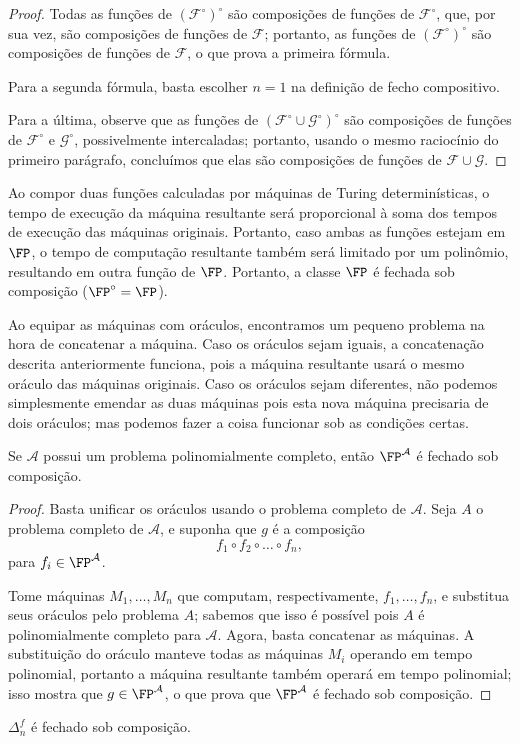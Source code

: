\begin{proof}
    Todas as funções de $(\mathcal F^\circ)^\circ$
    são composições de funções de $\mathcal F^\circ$,
    que, por sua vez,
    são composições de funções de $\mathcal F$;
    portanto, as funções de $(\mathcal F^\circ)^\circ$
    são composições de funções de $\mathcal F$,
    o que prova a primeira fórmula.

    Para a segunda fórmula,
    basta escolher $n = 1$ na definição de fecho compositivo.

    Para a última,
    observe que as funções de $(\mathcal F^\circ \cup \mathcal G^\circ)^\circ$
    são composições de funções de $\mathcal F^\circ$ e $\mathcal G^\circ$,
    possivelmente intercaladas;
    portanto, usando o mesmo raciocínio do primeiro parágrafo,
    concluímos que elas são composições de funções de
    $\mathcal F \cup \mathcal G$.
\end{proof}

Ao compor duas funções calculadas por máquinas de Turing determinísticas,
o tempo de execução da máquina resultante
será proporcional à soma dos tempos de execução das máquinas originais.
Portanto,
caso ambas as funções estejam em $\FP$,
o tempo de computação resultante também será limitado por um polinômio,
resultando em outra função de $\FP$.
Portanto,
a classe $\FP$ é fechada sob composição
($\FP^\circ = \FP$).

Ao equipar as máquinas com oráculos,
encontramos um pequeno problema na hora de concatenar a máquina.
Caso os oráculos sejam iguais,
a concatenação descrita anteriormente funciona,
pois a máquina resultante usará o mesmo oráculo das máquinas originais.
Caso os oráculos sejam diferentes,
não podemos simplesmente emendar as duas máquinas
pois esta nova máquina precisaria de dois oráculos;
mas podemos fazer a coisa funcionar sob as condições certas.

\begin{theorem}
    Se $\mathcal A$ possui um problema polinomialmente completo,
    então $\FP^\mathcal A$ é fechado sob composição.
\end{theorem}

\begin{proof}
    Basta unificar os oráculos usando o problema completo de $\mathcal A$.
    Seja $A$ o problema completo de $\mathcal A$,
    e suponha que $g$ é a composição
    \begin{equation*}
        f_1 \circ f_2 \circ \dots \circ f_n,
    \end{equation*}
    para $f_i \in \FP^\mathcal A$.

    Tome máquinas $M_1, \dots, M_n$ que computam,
    respectivamente, $f_1, \dots, f_n$,
    e substitua seus oráculos pelo problema $A$;
    sabemos que isso é possível pois $A$ é polinomialmente completo para $\mathcal A$.
    Agora,
    basta concatenar as máquinas.
    A substituição do oráculo manteve todas as máquinas $M_i$
    operando em tempo polinomial,
    portanto a máquina resultante também operará em tempo polinomial;
    isso mostra que $g \in \FP^\mathcal A$,
    o que prova que $\FP^\mathcal A$ é fechado sob composição.
\end{proof}

\begin{ucorollary}
    $\Delta_n^f$ é fechado sob composição.
\end{ucorollary}
